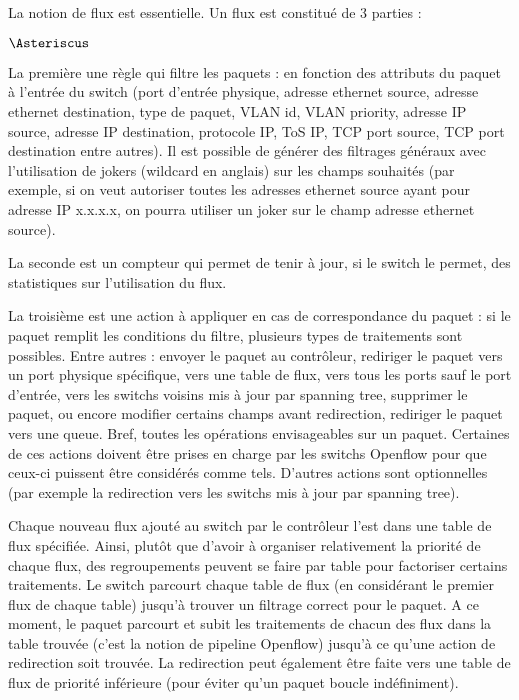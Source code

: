 La notion de flux est essentielle. Un flux est constitué de 3 parties :
\begin{list}{$\Asteriscus$}{}

\item La première une règle qui filtre les paquets : en fonction des attributs du paquet à l'entrée du switch (port d'entrée physique, adresse ethernet source, adresse ethernet destination, type de paquet, VLAN id, VLAN priority, adresse IP source, adresse IP destination, protocole IP, ToS IP, TCP port source, TCP port destination entre autres). Il est possible de générer des filtrages généraux avec l'utilisation de jokers (wildcard en anglais) sur les champs souhaités (par exemple, si on veut autoriser toutes les adresses ethernet source ayant pour adresse IP x.x.x.x, on pourra utiliser un joker sur le champ adresse ethernet source).

\item La seconde est un compteur qui permet de tenir à jour, si le switch le permet, des statistiques sur l'utilisation du flux.

\item La troisième est une action à appliquer en cas de correspondance du paquet : si le paquet remplit les conditions du filtre, plusieurs types de traitements sont possibles. Entre autres : envoyer le paquet au contrôleur, rediriger le paquet vers un port physique spécifique, vers une table de flux, vers tous les ports sauf le port d'entrée, vers les switchs voisins mis à jour par spanning tree, supprimer le paquet, ou encore modifier certains champs avant redirection, rediriger le paquet vers une queue. Bref, toutes les opérations envisageables sur un paquet. Certaines de ces actions doivent être prises en charge par les switchs Openflow pour que ceux-ci puissent être considérés comme tels. D'autres actions sont optionnelles (par exemple la redirection vers les switchs mis à jour par spanning tree).

\end{list}

Chaque nouveau flux ajouté au switch par le contrôleur l'est dans une table de flux spécifiée. Ainsi, plutôt que d'avoir à organiser relativement la priorité de chaque flux, des regroupements peuvent se faire par table pour factoriser certains traitements. Le switch parcourt chaque table de flux (en considérant le premier flux de chaque table) jusqu'à trouver un filtrage correct pour le paquet. A ce moment, le paquet parcourt et subit les traitements de chacun des flux dans la table trouvée (c'est la notion de pipeline Openflow) jusqu'à ce qu'une action de redirection soit trouvée. La redirection peut également être faite vers une table de flux de priorité inférieure (pour éviter qu'un paquet boucle indéfiniment).

